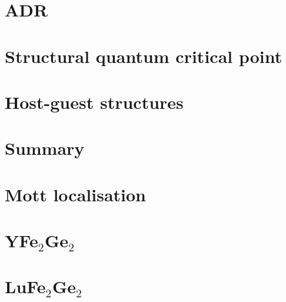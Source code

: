 \section{ADR}


\section{Structural quantum critical point}


\section{Host-guest structures}



\section{Summary}
%



\appendix

%
%
%
%
\section{Mott localisation}


\section{YFe$_2$Ge$_2$}


\section{LuFe$_2$Ge$_2$}

% 

% 









%
%

% 








